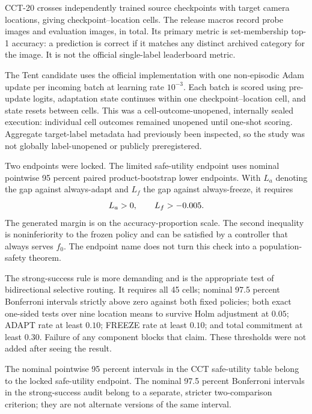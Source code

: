 CCT-20 crosses \CCTCheckpointCount{} independently trained source checkpoints with
\CCTLocationCount{} target camera locations, giving \CCTCellCount{} checkpoint--location cells.
The release macros record \CCTProbeImageCount{} probe images and
\CCTEvaluationImageCount{} evaluation images, \CCTTargetImageCount{} in total.  Its primary metric
is set-membership top-1 accuracy: a prediction is correct if it matches any distinct archived
category for the image.  It is not the official single-label leaderboard metric.

The Tent candidate uses the official implementation with one non-episodic Adam update per incoming
batch at learning rate $10^{-3}$.  Each batch is scored using pre-update logits, adaptation state
continues within one checkpoint--location cell, and state resets between cells.  This was a
cell-outcome-unopened, internally sealed execution: individual cell outcomes remained unopened until
one-shot scoring.  Aggregate target-label metadata had previously been inspected, so the study was
not globally label-unopened or publicly preregistered.

Two endpoints were locked.  The limited safe-utility endpoint uses nominal pointwise 95 percent
paired product-bootstrap lower endpoints.  With $L_a$ denoting the gap against always-adapt and
$L_f$ the gap against always-freeze, it requires
\begin{equation}
  L_a>0,\qquad L_f>-0.005.
\label{fr:eq-cct-safe-utility}
\end{equation}
The generated margin \CCTSafeUtilityMargin{} is on the accuracy-proportion scale.  The second
inequality is noninferiority to the frozen policy and can be satisfied by a controller that always
serves $f_0$.  The endpoint name does not turn this check into a population-safety theorem.

The strong-success rule is more demanding and is the appropriate test of bidirectional selective
routing.  It requires all 45 cells; nominal 97.5 percent Bonferroni intervals strictly above zero
against both fixed policies; both exact one-sided tests over nine location means to survive Holm
adjustment at $0.05$; ADAPT rate at least $0.10$; FREEZE rate at least $0.10$; and total commitment
at least $0.30$.  Failure of any component blocks that claim.  These thresholds were not added
after seeing the result.

The nominal pointwise 95 percent intervals in the CCT safe-utility table belong to the locked
safe-utility endpoint.  The nominal 97.5 percent Bonferroni intervals in the strong-success audit
belong to a separate, stricter two-comparison criterion; they are not alternate versions of the same
interval.

